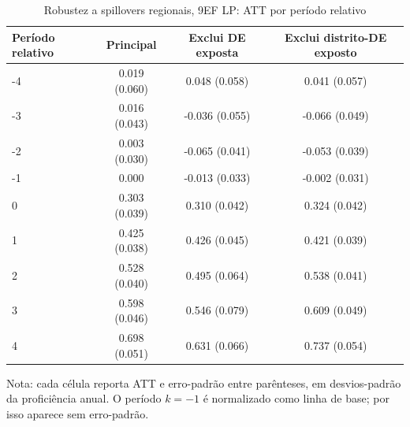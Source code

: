 \begin{table}[!htbp]
\centering
\caption{Robustez a spillovers regionais, 9EF LP: ATT por período relativo}
\label{tab:ap_event_spillover_9ef_lp}
\vspace{-0.15cm}
\scriptsize
\setlength{\tabcolsep}{4pt}
\renewcommand{\arraystretch}{0.92}
\begin{tabular}{lccc}
\toprule
Período relativo & Principal & Exclui DE exposta & Exclui distrito-DE exposto \\
\midrule
-4 & 0.019 (0.060) & 0.048 (0.058) & 0.041 (0.057) \\
-3 & 0.016 (0.043) & -0.036 (0.055) & -0.066 (0.049) \\
-2 & 0.003 (0.030) & -0.065 (0.041) & -0.053 (0.039) \\
-1 & 0.000 & -0.013 (0.033) & -0.002 (0.031) \\
0 & 0.303 (0.039) & 0.310 (0.042) & 0.324 (0.042) \\
1 & 0.425 (0.038) & 0.426 (0.045) & 0.421 (0.039) \\
2 & 0.528 (0.040) & 0.495 (0.064) & 0.538 (0.041) \\
3 & 0.598 (0.046) & 0.546 (0.079) & 0.609 (0.049) \\
4 & 0.698 (0.051) & 0.631 (0.066) & 0.737 (0.054) \\
\bottomrule
\end{tabular}
\begin{flushleft}
\footnotesize Nota: cada célula reporta ATT e erro-padrão entre parênteses, em desvios-padrão da proficiência anual. O período \(k=-1\) é normalizado como linha de base; por isso aparece sem erro-padrão.
\end{flushleft}
\end{table}

